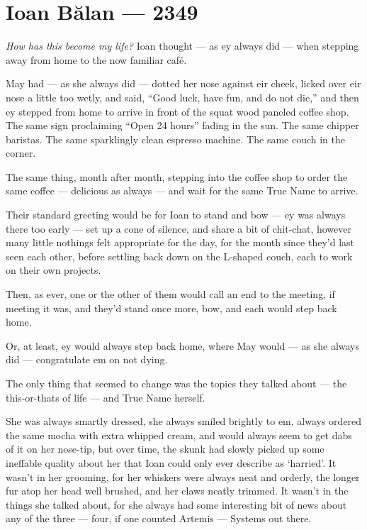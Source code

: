 \hypertarget{ioan-bux103lan-2349}{%
\chapter{Ioan Bălan — 2349}\label{ioan-bux103lan-2349}}

\emph{How has this become my life?} Ioan thought — as ey always did — when stepping away from home to the now familiar café.

May had — as she always did — dotted her nose against eir cheek, licked over eir nose a little too wetly, and said, ``Good luck, have fun, and do not die,'' and then ey stepped from home to arrive in front of the squat wood paneled coffee shop. The same sign proclaiming ``Open 24 hours'' fading in the sun. The same chipper baristas. The same sparklingly clean espresso machine. The same couch in the corner.

The same thing, month after month, stepping into the coffee shop to order the same coffee — delicious as always — and wait for the same True Name to arrive.

Their standard greeting would be for Ioan to stand and bow — ey was always there too early — set up a cone of silence, and share a bit of chit-chat, however many little nothings felt appropriate for the day, for the month since they'd last seen each other, before settling back down on the L-shaped couch, each to work on their own projects.

Then, as ever, one or the other of them would call an end to the meeting, if meeting it was, and they'd stand once more, bow, and each would step back home.

Or, at least, ey would always step back home, where May would — as she always did — congratulate em on not dying.

The only thing that seemed to change was the topics they talked about — the this-or-thats of life — and True Name herself.

She was always smartly dressed, she always smiled brightly to em, always ordered the same mocha with extra whipped cream, and would always seem to get dabs of it on her nose-tip, but over time, the skunk had slowly picked up some ineffable quality about her that Ioan could only ever describe as `harried'. It wasn't in her grooming, for her whiskers were always neat and orderly, the longer fur atop her head well brushed, and her claws neatly trimmed. It wasn't in the things she talked about, for she always had some interesting bit of news about any of the three — four, if one counted Artemis — Systems out there.

